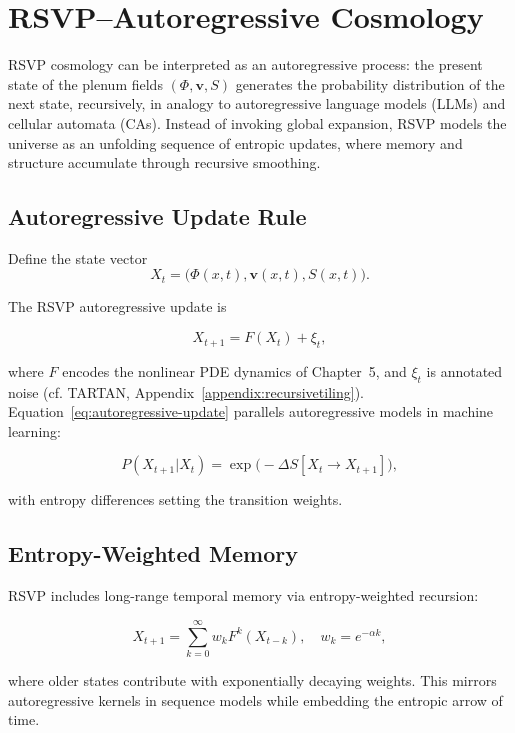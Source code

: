 \documentclass[12pt]{report}
\begin{document}
\chapter{RSVP--Autoregressive Cosmology}

RSVP cosmology can be interpreted as an autoregressive process: the present state of the plenum fields $(\Phi,\mathbf{v},S)$ generates the probability distribution of the next state, recursively, in analogy to autoregressive language models (LLMs) and cellular automata (CAs). Instead of invoking global expansion, RSVP models the universe as an unfolding sequence of entropic updates, where memory and structure accumulate through recursive smoothing.

\section{Autoregressive Update Rule}

Define the state vector
\[
X_t = \big(\Phi(x,t), \mathbf{v}(x,t), S(x,t)\big).
\]

The RSVP autoregressive update is

\begin{equation}
X_{t+1} = F(X_t) + \xi_t,
\label{eq:autoregressive-update}
\end{equation}

where $F$ encodes the nonlinear PDE dynamics of Chapter~5, and $\xi_t$ is annotated noise (cf. TARTAN, Appendix~\ref{appendix:recursivetiling}).  
Equation~\eqref{eq:autoregressive-update} parallels autoregressive models in machine learning:

\begin{equation}
P(X_{t+1}|X_t) = \exp\!\big(-\Delta S[X_t \to X_{t+1}]\big),
\end{equation}

with entropy differences setting the transition weights.

\section{Entropy-Weighted Memory}

RSVP includes long-range temporal memory via entropy-weighted recursion:

\begin{equation}
X_{t+1} = \sum_{k=0}^\infty w_k F^k(X_{t-k}), 
\quad w_k = e^{-\alpha k},
\label{eq:entropy-memory}
\end{equation}

where older states contribute with exponentially decaying weights. This mirrors autoregressive kernels in sequence models while embedding the entropic arrow of time.
\end{document}
